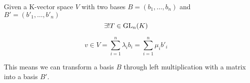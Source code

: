 \begin{definition}\label{def:bases_transmat}
   Given a K-vector space \(V\) with two bases \(B = (b_1, \ldots, b_n)\) and \(B' = (b'_1, \ldots, b'_n)\)
   \[\exists! T \in \operatorname{GL}_n(K)\]

   \begin{center}
   \end{center}
   \[v \in V = \sum_{i=1}^n \lambda_i b_i = \sum_{i=1}^n \mu_i b'_i\]
\end{definition}

This means we can transform a basis \(B\) through left multiplication with a matrix into a basis \(B'\).

